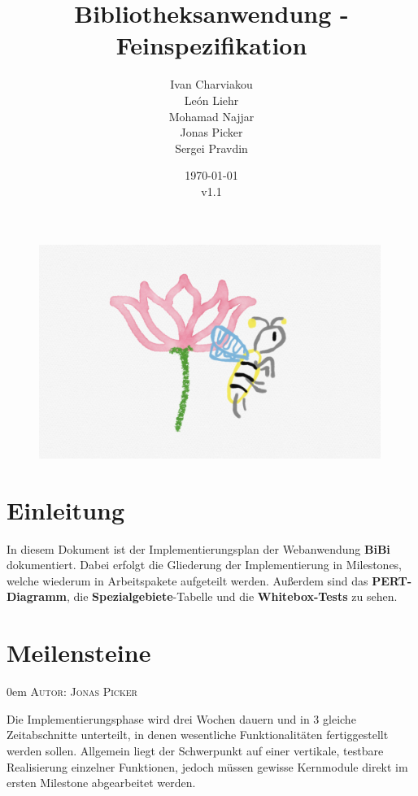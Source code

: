 \documentclass{article}
\title{Bibliotheksanwendung - Feinspezifikation}
\date{\today\\v1.1}
\author{
	Ivan Charviakou\\
	León Liehr\\
	Mohamad Najjar\\
	Jonas Picker\\
	Sergei Pravdin
}
\makeatletter
\newcommand{\sectionauthor}[1]{
	{\parindent 0em \large \scshape Autor: #1 \par \nobreak \vspace*{1em}}
	\@afterheading
}
\makeatother
\begin{document}
\maketitle
\begin{figure}[H]
	\centering
	\includegraphics[width = 30em]{Logo}
\end{figure}
\newpage
\tableofcontents
\newpage


\section{Einleitung}

In diesem Dokument ist der Implementierungsplan der Webanwendung \textbf{BiBi} dokumentiert. Dabei  erfolgt die Gliederung der Implementierung in Milestones, welche wiederum in Arbeitspakete aufgeteilt werden. Außerdem sind das \textbf{PERT-Diagramm},   die \textbf{Spezialgebiete}-Tabelle und die \textbf{Whitebox-Tests} zu sehen.


\section{Meilensteine}
\sectionauthor{Jonas Picker}
Die Implementierungsphase wird drei Wochen dauern und in 3 gleiche Zeitabschnitte unterteilt, in denen wesentliche Funktionalitäten fertiggestellt werden sollen. Allgemein liegt der Schwerpunkt auf einer vertikale, testbare Realisierung einzelner Funktionen, jedoch müssen gewisse Kernmodule direkt im ersten Milestone abgearbeitet werden.
\end{document}
